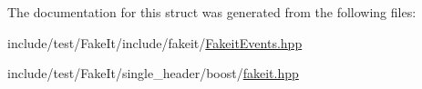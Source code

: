 The documentation for this struct was generated from the following files\+:\begin{DoxyCompactItemize}
\item 
include/test/\+Fake\+It/include/fakeit/\mbox{\hyperlink{FakeitEvents_8hpp}{Fakeit\+Events.\+hpp}}\item 
include/test/\+Fake\+It/single\+\_\+header/boost/\mbox{\hyperlink{single__header_2boost_2fakeit_8hpp}{fakeit.\+hpp}}\end{DoxyCompactItemize}
